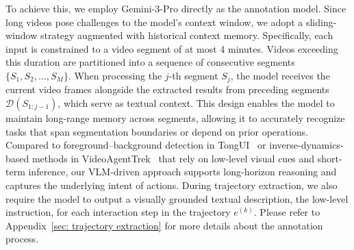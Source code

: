\documentclass{article}
\theoremstyle{plain}
\theoremstyle{definition}
\theoremstyle{remark}
\begin{document}
To achieve this, we employ Gemini-3-Pro directly as the annotation model. Since long videos pose challenges to the model’s context window, we adopt a sliding-window strategy augmented with historical context memory. Specifically, each input is constrained to a video segment of at most 4 minutes. Videos exceeding this duration are partitioned into a sequence of consecutive segments $\{S_1, S_2, \dots, S_M\}$. 
When processing the $j$-th segment $S_j$, the model receives the current video frames alongside the extracted results from preceding segments $\mathcal{D}(S_{1:j-1})$, which serve as textual context. 
This design enables the model to maintain long-range memory across segments, allowing it to accurately recognize tasks that span segmentation boundaries or depend on prior operations. 
Compared to foreground–background detection in TongUI~\citep{zhang2025tongui} or inverse-dynamics-based methods in VideoAgentTrek~\citep{lu2025videoagenttrek} that rely on low-level visual cues and short-term inference, our VLM-driven approach supports long-horizon reasoning and captures the underlying intent of actions.
During trajectory extraction, we also require the model to output a visually grounded textual description, the low-level instruction, for each interaction step in the trajectory $e^{(k)}$. Please refer to Appendix~\ref{sec: trajectory extraction} for more details about the annotation process.
\end{document}
